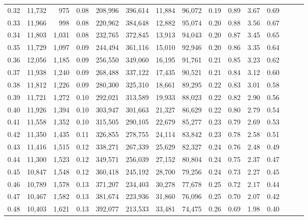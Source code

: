 \begin{tabular}{rrrrrrrrrrrrrrr}
0.32 &  11,732 &    975 &  0.08 &  208,996 &  396,614 &   11,884 &   96,072 &  0.19 &  0.89 &  3.67 &      0.69 \\
0.33 &  11,966 &    998 &  0.08 &  220,962 &  384,648 &   12,882 &   95,074 &  0.20 &  0.88 &  3.56 &      0.67 \\
0.34 &  11,803 &  1,031 &  0.08 &  232,765 &  372,845 &   13,913 &   94,043 &  0.20 &  0.87 &  3.45 &      0.65 \\
0.35 &  11,729 &  1,097 &  0.09 &  244,494 &  361,116 &   15,010 &   92,946 &  0.20 &  0.86 &  3.35 &      0.64 \\
0.36 &  12,056 &  1,185 &  0.09 &  256,550 &  349,060 &   16,195 &   91,761 &  0.21 &  0.85 &  3.23 &      0.62 \\
0.37 &  11,938 &  1,240 &  0.09 &  268,488 &  337,122 &   17,435 &   90,521 &  0.21 &  0.84 &  3.12 &      0.60 \\
0.38 &  11,812 &  1,226 &  0.09 &  280,300 &  325,310 &   18,661 &   89,295 &  0.22 &  0.83 &  3.01 &      0.58 \\
0.39 &  11,721 &  1,272 &  0.10 &  292,021 &  313,589 &   19,933 &   88,023 &  0.22 &  0.82 &  2.90 &      0.56 \\
0.40 &  11,926 &  1,394 &  0.10 &  303,947 &  301,663 &   21,327 &   86,629 &  0.22 &  0.80 &  2.79 &      0.54 \\
0.41 &  11,558 &  1,352 &  0.10 &  315,505 &  290,105 &   22,679 &   85,277 &  0.23 &  0.79 &  2.69 &      0.53 \\
0.42 &  11,350 &  1,435 &  0.11 &  326,855 &  278,755 &   24,114 &   83,842 &  0.23 &  0.78 &  2.58 &      0.51 \\
0.43 &  11,416 &  1,515 &  0.12 &  338,271 &  267,339 &   25,629 &   82,327 &  0.24 &  0.76 &  2.48 &      0.49 \\
0.44 &  11,300 &  1,523 &  0.12 &  349,571 &  256,039 &   27,152 &   80,804 &  0.24 &  0.75 &  2.37 &      0.47 \\
0.45 &  10,847 &  1,548 &  0.12 &  360,418 &  245,192 &   28,700 &   79,256 &  0.24 &  0.73 &  2.27 &      0.45 \\
0.46 &  10,789 &  1,578 &  0.13 &  371,207 &  234,403 &   30,278 &   77,678 &  0.25 &  0.72 &  2.17 &      0.44 \\
0.47 &  10,467 &  1,582 &  0.13 &  381,674 &  223,936 &   31,860 &   76,096 &  0.25 &  0.70 &  2.07 &      0.42 \\
0.48 &  10,403 &  1,621 &  0.13 &  392,077 &  213,533 &   33,481 &   74,475 &  0.26 &  0.69 &  1.98 &      0.40 \\

\end{tabular}

